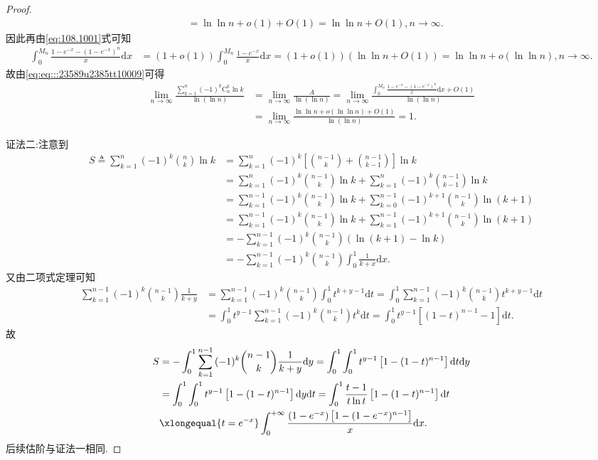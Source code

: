 \documentclass[../../main.tex]{subfiles}
\begin{document}
\begin{proof}
\begin{align*}
&=\ln\ln n+o\left( 1 \right) +O\left( 1 \right) =\ln\ln n+O\left( 1 \right) ,n\rightarrow \infty .
\end{align*}
因此再由\eqref{eq:108.1001}式可知
\begin{align*}
\int_0^{M_n}{\frac{1-e^{-x}-\left( 1-e^{-x} \right) ^n}{x}\mathrm{d}x}&=\left( 1+o\left( 1 \right) \right) \int_0^{M_n}{\frac{1-e^{-x}}{x}\mathrm{d}x}=\left( 1+o\left( 1 \right) \right) \left( \ln\ln n+O\left( 1 \right) \right) =\ln\ln n+o\left( \ln\ln n \right) ,n\rightarrow \infty .
\end{align*}
故由\eqref{eq:eq:::23589u2385tt10009}可得
\begin{align*}
\lim_{n\rightarrow \infty} \frac{\sum\limits_{k=1}^n{\left( -1 \right) ^k\mathrm{C}_{n}^{k}\ln k}}{\ln \left( \ln n \right)}&=\lim_{n\rightarrow \infty} \frac{A}{\ln \left( \ln n \right)}=\lim_{n\rightarrow \infty} \frac{\int_0^{M_n}{\frac{1-e^{-x}-\left( 1-e^{-x} \right) ^n}{x}\mathrm{d}x}+O\left( 1 \right)}{\ln \left( \ln n \right)} \\
&=\lim_{n\rightarrow \infty} \frac{\ln\ln n+o\left( \ln\ln n \right) +O\left( 1 \right)}{\ln \left( \ln n \right)}=1.
\end{align*}

{\color{blue}证法二:}注意到
\begin{align*}
S\triangleq \sum_{k=1}^n{(-1) ^k\binom{n}{k}\ln k}&=\sum_{k=1}^n{(-1) ^k\left[\binom{n-1}{k}+\binom{n-1}{k-1}\right]\ln k}
\\
&=\sum_{k=1}^n{(-1) ^k\binom{n-1}{k}\ln k}+\sum_{k=1}^n{(-1) ^k\binom{n-1}{k-1}\ln k}
\\
&=\sum_{k=1}^{n-1}{(-1) ^k\binom{n-1}{k}\ln k}+\sum_{k=0}^{n-1}{(-1) ^{k+1}\binom{n-1}{k}\ln (k+1)}
\\
&=\sum_{k=1}^{n-1}{(-1) ^k\binom{n-1}{k}\ln k}+\sum_{k=1}^{n-1}{(-1) ^{k+1}\binom{n-1}{k}\ln (k+1)}
\\
&=-\sum_{k=1}^{n-1}{(-1) ^k\binom{n-1}{k}\left(\ln (k+1)-\ln k\right)}
\\
&=-\sum_{k=1}^{n-1}{(-1) ^k\binom{n-1}{k}\int_0^1{\frac{1}{k+x}\mathrm{d}x}}.
\end{align*}
又由二项式定理可知
\begin{align*}
\sum_{k=1}^{n-1}{(-1) ^k\binom{n-1}{k}\frac{1}{k+y}}&=\sum_{k=1}^{n-1}{(-1) ^k\binom{n-1}{k}\int_0^1{t^{k+y-1}\mathrm{d}t}}=\int_0^1{\sum_{k=1}^{n-1}{(-1) ^k\binom{n-1}{k}}t^{k+y-1}\mathrm{d}t}
\\
&=\int_0^1{t^{y-1}\sum_{k=1}^{n-1}{(-1) ^k\binom{n-1}{k}}t^k\mathrm{d}t}=\int_0^1{t^{y-1}\left[(1-t) ^{n-1}-1\right] \mathrm{d}t}.
\end{align*}
故
\begin{align*}
S&=-\int_0^1{\sum_{k=1}^{n-1}{(-1) ^k\binom{n-1}{k}\frac{1}{k+y}}\mathrm{d}y}=\int_0^1{\int_0^1{t^{y-1}\left[1-(1-t) ^{n-1}\right] \mathrm{d}t}\mathrm{d}y}
\\
&=\int_0^1{\int_0^1{t^{y-1}\left[1-(1-t) ^{n-1}\right] \mathrm{d}y}\mathrm{d}t}=\int_0^1{\frac{t-1}{t\ln t}\left[1-(1-t) ^{n-1}\right] \mathrm{d}t}
\\
&\xlongequal{t=e^{-x}}\int_0^{+\infty}{\frac{(1-e^{-x})\left[ 1-(1-e^{-x})^{n-1} \right]}{x}\mathrm{d}x}.
\end{align*}
后续估阶与证法一相同.


\end{proof}
\end{document}

